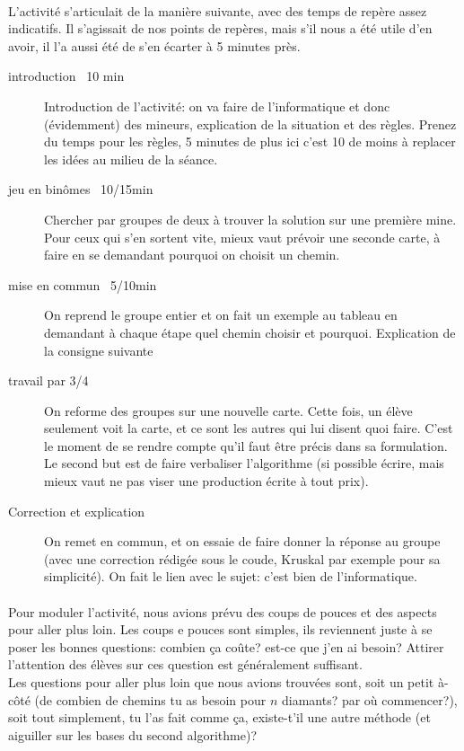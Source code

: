 \documentclass{article}
\begin{document}
\paragraph{}
L'activité s'articulait de la manière suivante, avec des temps de repère assez 
indicatifs. Il s'agissait de nos points de repères, mais s'il nous a été utile 
d'en avoir, il l'a aussi été de s'en écarter à 5 minutes près.
\begin{description}
\item[introduction ~10 min] Introduction de l'activité: on va faire de l'informatique
et donc (évidemment) des mineurs, explication de la situation et des règles.
Prenez du temps pour les règles, 5 minutes de plus ici c'est 10 de moins à replacer
les idées au milieu de la séance.
\item[jeu en binômes ~10/15min] Chercher par groupes de deux à trouver la 
solution sur une première mine. Pour ceux qui s'en sortent vite, mieux vaut 
prévoir une seconde carte, à faire en se demandant pourquoi on choisit un chemin.
\item[mise en commun ~5/10min] On reprend le groupe entier et on fait un exemple
au tableau en demandant à chaque étape quel chemin choisir et pourquoi. Explication
de la consigne suivante
\item[travail par 3/4] On reforme des groupes sur une nouvelle carte. Cette fois,
	un élève seulement voit la carte, et ce sont les autres qui lui disent quoi faire.
	C'est le moment de se rendre compte qu'il faut être précis dans sa formulation.
	Le second but est de faire verbaliser l'algorithme (si possible écrire, mais mieux
			vaut ne pas viser une production écrite à tout prix).
	\item[Correction et explication] On remet en commun, et on essaie de faire donner
	la réponse au groupe (avec une correction rédigée sous le coude, Kruskal par exemple
			pour sa simplicité). On fait le lien avec le sujet: c'est bien de l'informatique.
	\end{description}

	\paragraph{}
	Pour moduler l'activité, nous avions prévu des coups de pouces et des aspects
	pour aller plus loin. Les coups e pouces sont simples, ils reviennent juste à se
	poser les bonnes questions: combien ça coûte? est-ce que j'en ai besoin? Attirer
	l'attention des élèves sur ces question est généralement suffisant.
	\\Les questions pour aller plus loin que nous avions trouvées sont, soit
	un petit à-côté (de combien de chemins tu as besoin pour $n$ diamants? par où
			commencer?), soit tout simplement, tu l'as fait comme ça, existe-t'il une autre 
	méthode (et aiguiller sur les bases du second algorithme)? 
\end{document}

